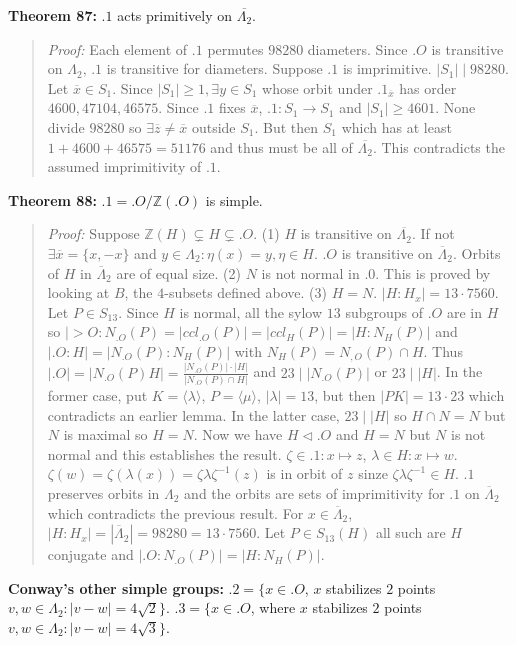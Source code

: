 {\bf Theorem 87:}
$.1$ acts primitively on ${\overline {\Lambda_2}}$.
\begin{quote}
\emph{Proof:} 
Each element of $.1$ permutes $98280$ diameters.  Since $.O$ is transitive on
$\Lambda_2$, $.1$ is transitive for diameters.  Suppose
$.1$ is imprimitive.  $|S_1| \mid 98280$.  Let ${\overline x} \in S_1$.
Since $|S_1| \ge 1, \exists y \in S_1$ whose orbit under $.1_{\overline x}$
has order $4600, 47104, 46575$.  Since $.1$ fixes ${\overline x}$,
$.1: S_1 \rightarrow S_1$ and $|S_1| \ge 4601$.  None divide
$98280$ so $\exists {\overline z} \ne {\overline x}$ outside $S_1$.
But then $S_1$ which has at least $1+4600+46575=51176$ and thus must be all of
${\overline {\Lambda_2}}$.  This contradicts the assumed imprimitivity of $.1$.
\end{quote}
{\bf Theorem 88:}
$.1= .O/{\mathbb Z}(.O)$ is simple.
\begin{quote}
\emph{Proof:} 
Suppose ${\mathbb Z}(H) \subsetneq H \subsetneq .O$.  
(1) $H$ is transitive on ${\overline {\Lambda_2}}$.
If not $\exists {\overline x}= \{x, -x\}$
and $y \in \Lambda_2: \eta(x)= y, \eta \in H$.  $.O$ is transitive on
${\overline {\Lambda}}_2$.  Orbits of $H$ in ${\overline {\Lambda}}_2$ are of
equal size.
(2) $N$ is not normal in $.0$.  This is proved by looking at $B$, the $4$-subsets defined above.
(3) $H=N$.  $|H:H_x|= 13 \cdot 7560$.  Let $P \in S_{13}$.  Since $H$ is normal, all the sylow $13$
subgroups of $.O$ are in $H$ so
$|>O:N_{.O}(P)= |ccl_{.O}(P)|=
|ccl_{H}(P)|= |H:N_H(P)|$ and $|.O:H|= |N_{.O}(P):N_H(P)|$ with $N_H(P)= N_{,O}(P) \cap H$.
Thus $|.O|= |N_{.O}(P)H|= {\frac
{|N_{.O}(P)| \cdot |H|}
{|N_{.O}(P) \cap H|}}$ and
$23 \mid |N_{.O}(P)|$ or $23 \mid |H|$.  In the former case, put
$K= \langle \lambda \rangle$,
$P= \langle \mu \rangle$, $|\lambda|= 13$, but then $|PK|=13 \cdot 23$ which contradicts an
earlier lemma.  In the latter case,  $23 \mid |H|$ so $H \cap N = N$ but $N$ is maximal so
$H=N$.
Now we have $H \lhd .O$ and $H=N$ but $N$ is not normal and this establishes the result.
$\zeta \in .1: x \mapsto z$,
$\lambda \in H: x \mapsto w$.
$\zeta(w)= \zeta(\lambda(x))= \zeta \lambda \zeta^{-1}(z)$ is in orbit of $z$
sinze $\zeta \lambda \zeta^{-1} \in H$.  $.1$ preserves orbits in
$\Lambda_2$ and the orbits are sets of imprimitivity for $.1$ on
${\overline {\Lambda}}_2$ which contradicts the previous result.
For $x \in {\overline {\Lambda}}_2$, 
$|H:H_x|=|{\overline {\Lambda}}_2| = 98280= 13 \cdot 7560$.
Let $P \in S_{13}(H)$ all such are $H$ conjugate and
$|.O:N_{.O}(P)|= |H:N_H(P)|$.
\end{quote}
{\bf Conway's other simple groups:} 
$.2= \{ x \in .O$, $x$ stabilizes
$2$ points $v,w \in \Lambda_2: |v-w|= 4 {\sqrt 2} \}$.
$.3= \{ x \in .O$, where $x$ stabilizes
$2$ points $v,w \in \Lambda_2: |v-w|= 4 {\sqrt 3} \}$.
